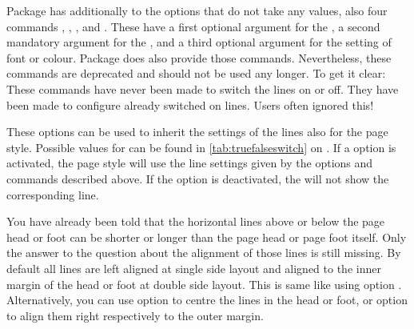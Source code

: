 %
%
%
%
Package  has additionally to the options that do not take
any values, also four commands
,
,
, and
. These have a first
optional argument for the , a second mandatory argument for the
, and a third optional argument for the setting of font or
colour. Package  does also provide those
commands. Nevertheless, these commands are deprecated and should not be used
any longer. To get it clear: These commands have never been made to
switch the lines on or off. They have been made to configure already switched
on lines. Users often ignored this!%
%
%
%
%
%
\EndIndexGroup


\begin{Declaration}
\end{Declaration}
These options can be used to inherit the settings of the lines also for the
 page style. Possible values for  can be
found in \autoref{tab:truefalseswitch} on
. If a option is activated, the
 page style will use the line settings given by the options
and commands described above. If the option is deactivated, the
 will not show the corresponding line.%
\EndIndexGroup


\begin{Declaration}
\end{Declaration}
You have already been told that the horizontal lines above or below the page
head or foot can be shorter or longer than the page head or page foot
itself. Only the answer to the question about the alignment of those lines is
still missing. By default all lines are left aligned at single side layout and
aligned to the inner margin of the head or foot at double side layout. This
is same like using option . Alternatively, you can use option
 to centre the lines in the head or foot, or option
 to align them right respectively to the outer margin.%
\EndIndexGroup
%
\EndIndexGroup


